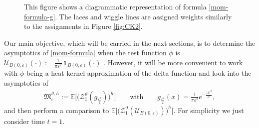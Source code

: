 \documentclass[a4paper,reqno,11pt]{amsart}
\numberwithin{equation}{section}
\theoremstyle{mytheorem}
\newcommand{\bbE}{{\ensuremath{\mathbb E}} }
\newcommand{\cU}{{\ensuremath{\mathcal U}} }
\newcommand{\ind}{\mathds{1}}
\renewcommand{\epsilon}{\varepsilon}
\renewcommand{\theta}{\vartheta}
\newcommand{\f}{\frac}
\begin{document}
{\begin{figure}
    \caption{
    This figure shows a diagrammatic representation of formula \eqref{mom-formula-g}. The laces 
    and wiggle lines are assigned weights similarly to the assignments in Figure \ref{fig:CK2}.
    }\label{Fig2}
\end{figure}
\vskip 2mm
 Our main objective, which will be carried in the next sections, is to determine the asymptotics of 
 \eqref{mom-formula} when the test function $\phi$ is $\cU_{B(0,\epsilon)}(\cdot) := \frac{1}{\pi \epsilon^2} \, \ind_{B(0,\epsilon)}(\cdot)$ .
However, it will be more convenient to work with $\phi$ being a heat kernel approximation of the delta function 
and look into the asymptotics of
 \begin{align}\label{def:Zscr}
 \mathfrak{M}_\epsilon^{\theta,h}
 := \bbE\Big[ \big( \mathscr{Z}_{1}^\theta(g_{\f{\epsilon^2}{2}}) \big)^h\Big] 
 \qquad \text{with}
 \qquad  g_{\f{\epsilon^2}{2}}(x)=\frac{1}{\pi\epsilon^2}e^{-\frac{|x|^2}{\epsilon^2}},
 \end{align}
 and then perform a comparison to $\bbE\Big[ \big( \mathscr{Z}_{1}^\theta( \cU_{B(0,\epsilon)}) \big)^h\Big]$.
For simplicity we just consider time $t=1$.

}
\end{document}
